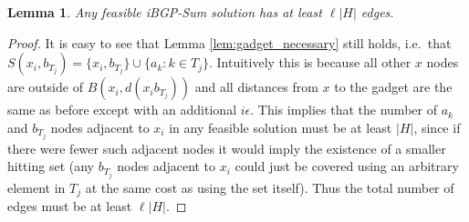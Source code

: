 \documentclass[11pt,letterpaper]{article}
\newtheorem{lemma}[theorem]{Lemma}
\theoremstyle{definition}
\begin{document}
\begin{lemma} \label{lem:ibgp-sum-necessary}
  Any feasible {\sc iBGP-Sum} solution has at least $\ell |H|$ edges.
\end{lemma}
\begin{proof}
  It is easy to see that Lemma \ref{lem:gadget_necessary} still holds,
  i.e.~that $S(x_i, b_{T_j}) = \{x_i, b_{T_j}\} \cup \{a_k : k \in
  T_j\}$.  Intuitively this is because all other $x$ nodes are outside
  of $B(x_i, d(x_i b_{T_j}))$ and all distances from $x$ to the gadget
  are the same as before except with an additional $i\epsilon$.  This
  implies that the number of $a_k$ and $b_{T_j}$ nodes adjacent to
  $x_i$ in any feasible solution must be at least $|H|$, since if
  there were fewer such adjacent nodes it would imply the existence of
  a smaller hitting set (any $b_{T_j}$ nodes adjacent to $x_i$ could
  just be covered using an arbitrary element in $T_j$ at the same cost
  as using the set itself).  Thus the total number of edges must be at
  least $\ell |H|$.
\end{proof}
\end{document}
